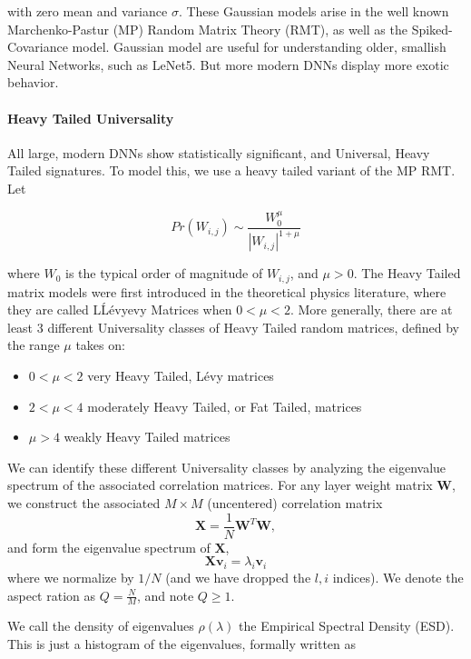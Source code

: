 with zero mean and variance $\sigma$.  These Gaussian models arise in the well known Marchenko-Pastur (MP) Random Matrix Theory (RMT),
as well as the Spiked-Covariance model. Gaussian model are useful for understanding older, smallish Neural Networks, such as LeNet5.
But more modern DNNs display more exotic behavior.  

\paragraph{Heavy Tailed Universality} All large, modern DNNs show statistically significant, and Universal, Heavy Tailed signatures.  
To model this, we use a heavy tailed variant of the MP RMT.  Let 

$$Pr(W_{i,j})\sim\dfrac{W_{0}^{\mu}}{|W_{i,j}|^{1+\mu}}$$

where $W_{0}$ is the typical order of magnitude of $W_{i,j}$, and $\mu>0$. The Heavy Tailed matrix models were first introduced
in the theoretical physics literature, where they are called L\'L\'evyevy Matrices when $0<\mu<2$\cite{bouchaud1994}.
More generally, there are at least 3 different Universality classes of Heavy Tailed random matrices, defined by the range $\mu$ takes on:

\begin{itemize}
\item $0<\mu<2$ very Heavy Tailed, L\'evy matrices
\item $2<\mu<4$ moderately Heavy Tailed, or Fat Tailed, matrices
\item $\mu>4$ weakly Heavy Tailed matrices
\end{itemize}

We can identify these different Universality classes by analyzing the eigenvalue spectrum of the associated correlation matrices. For any layer weight matrix $\mathbf{W}$, we construct the associated $M\times M$ (uncentered) correlation matrix
\begin{equation}
\mathbf{X} = \dfrac{1}{N}\mathbf{W}^{T}\mathbf{W}  ,
\label{eqn:unc_corr_mat}
\end{equation}
and form the eigenvalue spectrum of $\mathbf{X}$, 
$$
\mathbf{X}\mathbf{v}_{i}=\lambda_{i}\mathbf{v}_{i}
$$
where we normalize by $1/N$ (and we have dropped the $l,i$ indices).  We denote the aspect ration as $Q=\frac{N}{M}$, and note $Q\ge 1$.

We call the density of eigenvalues $\rho(\lambda)$ the Empirical Spectral Density (ESD).  This is just a histogram of the eigenvalues, formally written as

